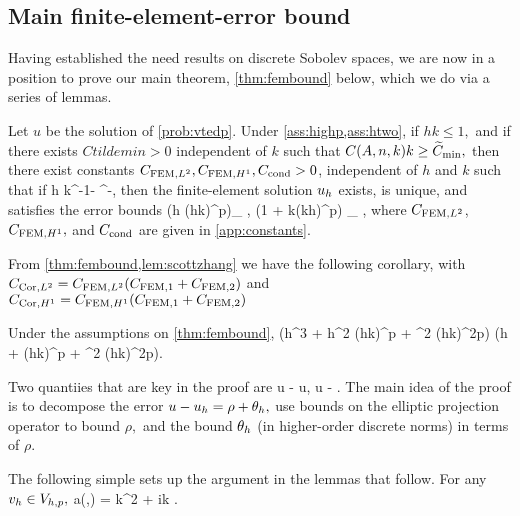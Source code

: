 \subsection{Main finite-element-error bound}\label{sec:fembound}

Having established the need results on discrete Sobolev spaces, we are now in a position to prove our main theorem, \cref{thm:fembound} below, which we do via a series of lemmas.

\label{thm:fembound}
Let $u$ be the solution of \cref{prob:vtedp}. Under \cref{ass:highp,ass:htwo}, if $hk \leq 1,$ and if there exists $Ctildemin > 0$ independent of $k$ such that $\CAnk k \geq \Ctildemin,$ then there exist constants $C_{\mathrm{FEM},L^{2}}, C_{\mathrm{FEM},H^{1}}, C_{\mathrm{cond}} > 0$, independent of $h$ and $k$ such that if
\beq\label{eq:hfemcond}
h \leq \Chcond k^{-1-} \CAnk^{-},
\eeq
then the finite-element solution $u_{h}$ exists, is unique, and satisfies the error bounds
\beq\label{eq:femltbound}
 \leq \CFEMLt \mleft(h \CAnk (hk)^{p}\mright)\inf_{\vh \in \Vhp} , \tand
\eeq
\beq
{} \leq \CFEMHo \mleft(1 + \CAnk k(kh)^p\mright) \inf_{\vh \in \Vhp} ,
\eeq\label{eq:femhobound}
where $C_{\mathrm{FEM},L^{2}}$, $C_{\mathrm{FEM},H^{1}},$ and $C_{\mathrm{cond}}$ are given in \cref{app:constants}.
\enth

From \cref{thm:fembound,lem:scottzhang} we have the following corollary, with $\CcorLt = \CFEMLt\mleft(\CFEMo+\CFEMt\mright)$ and $\CcorHo = \CFEMHo\mleft(\CFEMotilde+\CFEMttilde\mright)$

\label{cor:fembound}
Under the assumptions on \cref{thm:fembound},
\beqs
{} \leq \CcorLt \mleft(h^3 + \CAnk h^2 (hk)^p + \CAnk^2 (hk)^{2p}\mright)\Cfg\tand
\eeqs
\beqs
{} \leq \CcorHo \mleft(h + \CAnk (hk)^p + \CAnk^2 (hk)^{2p}\mright)\Cfg.
\eeqs
\eco{}


Two quantiies that are key in the proof are
\beqs
\rho \de u - \Ph u, \tand
\eeqs
\beqs
\thetah \de \Ph u - \uh.
\eeqs
The main idea of the proof is to decompose the error $u - u_{h} = \rho + \theta_{h},$ use bounds on the elliptic projection operator to bound $\rho,$ and the bound $\theta_{h}$ (in higher-order discrete norms) in terms of $\rho.$

The following simple  sets up the argument in the lemmas that follow.
\label{lem:simpleform}
For any $v_{h} \in V_{h,p},$
\beq\label{eq:thetaform}
a(\thetah,\vh) = k^2\IPLtDn{\Qhn\rho}{\vh} + ik \IPLtGI{\rho}{\vh}.
\eeq
\ele

